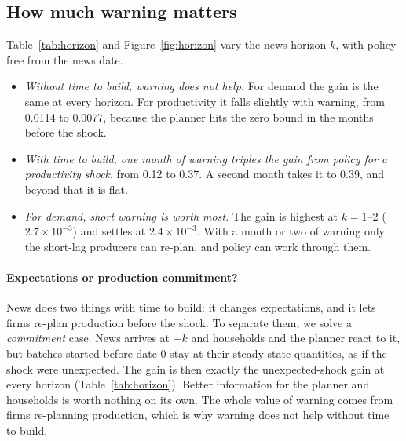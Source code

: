 \documentclass[11pt]{article}
\theoremstyle{definition}
\begin{document}
\subsection{How much warning matters}\label{sec:warning}

Table~\ref{tab:horizon} and Figure~\ref{fig:horizon} vary the news horizon $k$, with policy free from
the news date.
\begin{itemize}
  \item \emph{Without time to build, warning does not help.} For demand the gain is the same at every
        horizon. For productivity it falls slightly with warning, from 0.0114 to 0.0077, because the
        planner hits the zero bound in the months before the shock.
  \item \emph{With time to build, one month of warning triples the gain from policy for a productivity
        shock}, from 0.12 to 0.37. A second month takes it to 0.39, and beyond that it is flat.
  \item \emph{For demand, short warning is worth most.} The gain is highest at $k=1$--2 ($2.7\times10^{-3}$)
        and settles at $2.4\times10^{-3}$. With a month or two of warning only the short-lag producers can
        re-plan, and policy can work through them.
\end{itemize}

\paragraph{Expectations or production commitment?} News does two things with time to build: it changes
expectations, and it lets firms re-plan production before the shock. To separate them, we solve a
\emph{commitment} case. News arrives at $-k$ and households and the planner react to it, but batches
started before date 0 stay at their steady-state quantities, as if the shock were unexpected. The
gain is then exactly the unexpected-shock gain at every horizon (Table~\ref{tab:horizon}). Better
information for the planner and households is worth nothing on its own. The whole value of warning
comes from firms re-planning production, which is why warning does not help without time to build.
\end{document}
